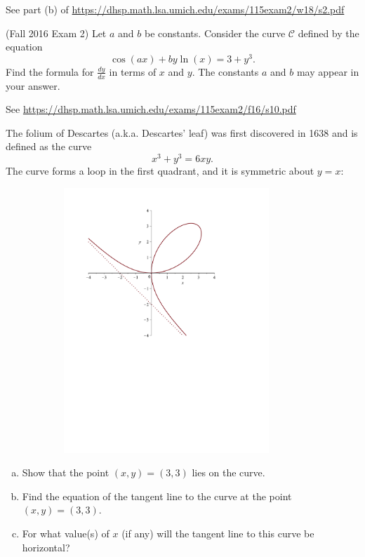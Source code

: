 \documentclass[11pt]{exam}
\begin{document}
\begin{questions}
\begin{solution}
     See part (b) of \href{https://dhsp.math.lsa.umich.edu/exams/115exam2/w18/s2.pdf}{https://dhsp.math.lsa.umich.edu/exams/115exam2/w18/s2.pdf}
   \end{solution}
   \vspace{0.1in}
\question (Fall 2016 Exam 2) Let $a$ and $b$ be constants. Consider the curve $\mathcal{C}$ defined by the equation
\[
\cos(ax)+by\ln(x)=3+y^3.
\]
Find the formula for $\frac{dy}{dx}$ in terms of $x$ and $y$. The constants $a$ and $b$ may appear in your answer. 
\begin{solution}
  See \href{https://dhsp.math.lsa.umich.edu/exams/115exam2/f16/s10.pdf}{https://dhsp.math.lsa.umich.edu/exams/115exam2/f16/s10.pdf}
\end{solution}
\vspace{0.1in}
\question The folium of Descartes (a.k.a. Descartes' leaf) was first discovered in 1638 and is defined as the curve
\begin{equation*}
	x^3+y^3=6xy.
\end{equation*}
The curve forms a loop in the first quadrant, and it is symmetric
about $y=x$:
\begin{figure}[h]
\centering
\includegraphics[width=10cm,height=10cm]{Figures/fig1.pdf}
\end{figure}
\begin{enumerate}[(a)]
	\item Show that the point $(x,y)=(3,3)$ lies on the curve.
	\item Find the equation of the tangent line to the curve at the point $(x,y)=(3,3)$.
	\item For what value(s) of $x$ (if any) will the tangent line to this curve be horizontal?

\end{enumerate}
\end{questions}
\end{document}
